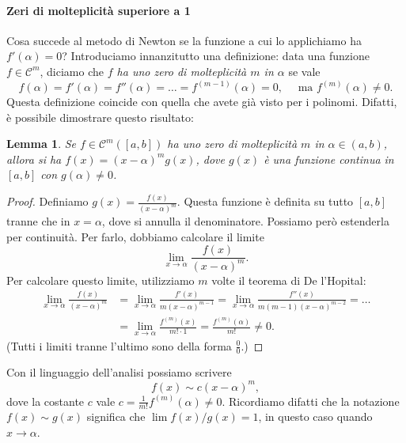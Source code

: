 \documentclass[a4paper]{report}
\newtheorem{lemma}[theorem]{Lemma}
\theoremstyle{definiton}
\theoremstyle{remark}
\begin{document}
\paragraph{Zeri di molteplicità superiore a 1} Cosa succede al metodo di Newton se la funzione a cui lo applichiamo ha $f'(\alpha) = 0$? Introduciamo innanzitutto una definizione: data una funzione $f\in\mathcal{C}^m$, diciamo che \emph{$f$ ha uno zero di molteplicità $m$ in $\alpha$} se vale
\[
f(\alpha) = f'(\alpha) = f''(\alpha) = \dots = f^{(m-1)}(\alpha) = 0, \quad \text{ ma } f^{(m)}(\alpha) \neq 0.
\]
Questa definizione coincide con quella che avete già visto per i polinomi. Difatti, è possibile dimostrare questo risultato:
\begin{lemma}
Se $f\in\mathcal{C}^m([a,b])$ ha uno zero di molteplicità $m$ in $\alpha \in (a,b)$, allora si ha $f(x) = (x-\alpha)^m g(x)$, dove $g(x)$ è una funzione continua in $[a,b]$ con $g(\alpha) \neq 0$.
\end{lemma}
\begin{proof}
Definiamo $g(x) = \frac{f(x)}{(x-\alpha)^m}$. Questa funzione è definita su tutto $[a,b]$ tranne che in $x=\alpha$, dove si annulla il denominatore. Possiamo però estenderla per continuità. Per farlo, dobbiamo calcolare il limite
\[
\lim_{x\to \alpha} \frac{f(x)}{(x-\alpha)^m}.
\]
Per calcolare questo limite, utilizziamo $m$ volte il teorema di De l'Hopital: 
\begin{align*}
\lim_{x\to \alpha} \frac{f(x)}{(x-\alpha)^m} &= \lim_{x\to \alpha} \frac{f'(x)}{m(x-\alpha)^{m-1}} = \lim_{x\to \alpha} \frac{f''(x)}{m(m-1)(x-\alpha)^{m-2}} = \dots \\
&= \lim_{x\to \alpha} \frac{f^{(m)}(x)}{m!\cdot 1} = \frac{f^{(m)}(\alpha)}{m!} \neq 0.
\end{align*}
(Tutti i limiti tranne l'ultimo sono della forma $\frac{0}{0}$.)
\end{proof}


Con il linguaggio dell'analisi possiamo scrivere
\[
    f(x) \sim c (x-\alpha)^m,
\]
dove la costante $c$ vale $c= \frac{1}{m!}f^{(m)}(\alpha) \neq 0$. Ricordiamo difatti che la notazione $f(x) \sim g(x)$ significa che $\lim f(x) / g(x) = 1$, in questo caso quando $x\to \alpha$.
\end{document}
